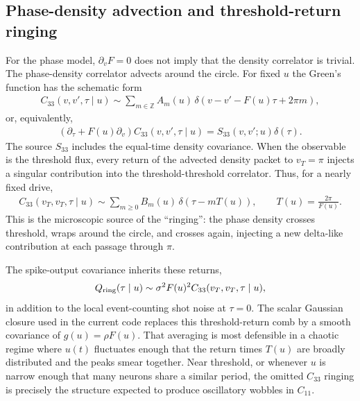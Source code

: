 \documentclass[pre,preprint,preprintnumbers,aps,eqsecnum,superscriptaddress,notitlepage,showpacs,floatfix]{revtex4-1}
\begin{document}
\subsection{Phase-density advection and threshold-return ringing}

For the phase model, $\partial_v F=0$ does not imply that the density
correlator is trivial.  The phase-density correlator advects around the
circle.  For fixed $u$ the Green's function has the schematic form
\begin{align}
C_{33}(v,v',\tau\mid u)
\sim
\sum_{m\in\mathbb Z}A_m(u)\,
\delta\!\left(v-v'-F(u)\tau+2\pi m\right),
\label{eq:C33_ring_green}
\end{align}
or, equivalently,
\begin{align}
(\partial_\tau+F(u)\partial_v)C_{33}(v,v',\tau\mid u)
=
S_{33}(v,v';u)\delta(\tau).
\label{eq:C33_advection}
\end{align}
The source $S_{33}$ includes the equal-time density covariance.  When the
observable is the threshold flux, every return of the advected density packet
to $v_T=\pi$ injects a singular contribution into the threshold-threshold
correlator.  Thus, for a nearly fixed drive,
\begin{align}
C_{33}(v_T,v_T,\tau\mid u)
\sim
\sum_{m\geq 0}B_m(u)\,
\delta\!\left(\tau-mT(u)\right),
\qquad
T(u)=\frac{2\pi}{F(u)}.
\label{eq:C33_threshold_comb}
\end{align}
This is the microscopic source of the ``ringing'': the phase density crosses
threshold, wraps around the circle, and crosses again, injecting a new
delta-like contribution at each passage through $\pi$.

The spike-output covariance inherits these returns,
\begin{align}
Q_{\rm ring}(\tau\mid u)
\sim
\sigma^2F(u)^2C_{33}(v_T,v_T,\tau\mid u),
\label{eq:Q_ring}
\end{align}
in addition to the local event-counting shot noise at $\tau=0$.  The scalar
Gaussian closure used in the current code replaces this threshold-return
comb by a smooth covariance of $g(u)=\rho F(u)$.  That averaging is most
defensible in a chaotic regime where $u(t)$ fluctuates enough that the return
times $T(u)$ are broadly distributed and the peaks smear together.  Near
threshold, or whenever $u$ is narrow enough that many neurons share a similar
period, the omitted $C_{33}$ ringing is precisely the structure expected to
produce oscillatory wobbles in $C_{11}$.

\end{document}
